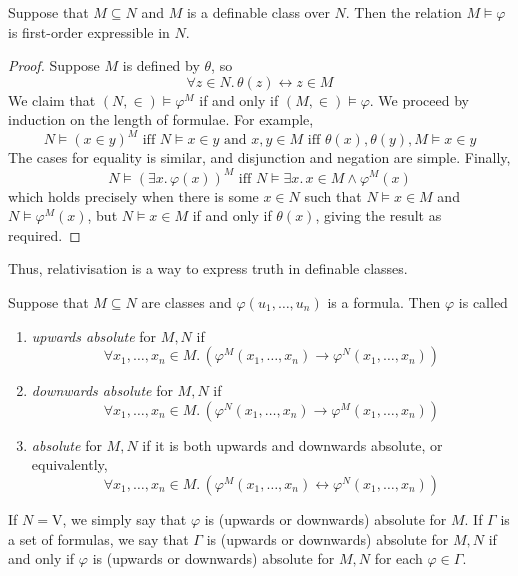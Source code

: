 \begin{proposition}
    Suppose that \( M \subseteq N \) and \( M \) is a definable class over \( N \).
    Then the relation \( M \vDash \varphi \) is first-order expressible in \( N \).
\end{proposition}
\begin{proof}
    Suppose \( M \) is defined by \( \theta \), so
    \[ \forall z \in N.\, \theta(z) \leftrightarrow z \in M \]
    We claim that \( (N, \in) \vDash \varphi^M \) if and only if \( (M, \in) \vDash \varphi \).
    We proceed by induction on the length of formulae.
    For example,
    \[ N \vDash (x \in y)^M \text{ iff } N \vDash x \in y \text{ and } x, y \in M \text{ iff } \theta(x), \theta(y), M \vDash x \in y \]
    The cases for equality is similar, and disjunction and negation are simple.
    Finally,
    \[ N \vDash (\exists x.\, \varphi(x))^M \text{ iff } N \vDash \exists x.\, x \in M \wedge \varphi^M(x) \]
    which holds precisely when there is some \( x \in N \) such that \( N \vDash x \in M \) and \( N \vDash \varphi^M(x) \), but \( N \vDash x \in M \) if and only if \( \theta(x) \), giving the result as required.
\end{proof}
Thus, relativisation is a way to express truth in definable classes.
\begin{definition}
    Suppose that \( M \subseteq N \) are classes and \( \varphi(u_1, \dots, u_n) \) is a formula.
    Then \( \varphi \) is called
    \begin{enumerate}
        \item \emph{upwards absolute} for \( M, N \) if
        \[ \forall x_1, \dots, x_n \in M.\, (\varphi^M(x_1, \dots, x_n) \to \varphi^N(x_1, \dots, x_n)) \]
        \item \emph{downwards absolute} for \( M, N \) if
        \[ \forall x_1, \dots, x_n \in M.\, (\varphi^N(x_1, \dots, x_n) \to \varphi^M(x_1, \dots, x_n)) \]
        \item \emph{absolute} for \( M, N \) if it is both upwards and downwards absolute, or equivalently,
        \[ \forall x_1, \dots, x_n \in M.\, (\varphi^M(x_1, \dots, x_n) \leftrightarrow \varphi^N(x_1, \dots, x_n)) \]
    \end{enumerate}
\end{definition}
If \( N = \mathrm{V} \), we simply say that \( \varphi \) is (upwards or downwards) absolute for \( M \).
If \( \Gamma \) is a set of formulas, we say that \( \Gamma \) is (upwards or downwards) absolute for \( M, N \) if and only if \( \varphi \) is (upwards or downwards) absolute for \( M, N \) for each \( \varphi \in \Gamma \).
